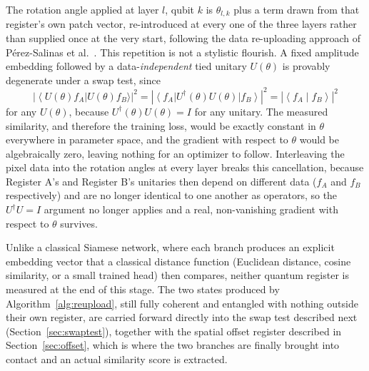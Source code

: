 \documentclass[conference]{IEEEtran}
\newcommand{\ket}[1]{\left|#1\right\rangle}
\newcommand{\bra}[1]{\left\langle#1\right|}
\newcommand{\braket}[2]{\left\langle#1\middle|#2\right\rangle}
\begin{document}
The rotation angle applied at layer $l$, qubit $k$ is $\theta_{l,k}$ plus a term drawn from that register's own patch vector, re-introduced at every one of the three layers rather than supplied once at the very start, following the data re-uploading approach of P\'erez-Salinas et al.~\cite{reuploading2020}. This repetition is not a stylistic flourish. A fixed amplitude embedding followed by a data-\emph{independent} tied unitary $U(\theta)$ is provably degenerate under a swap test, since
\begin{equation}
\left|\bra{U(\theta)f_A}U(\theta)f_B\rangle\right|^2
= \left|\bra{f_A}U^\dagger(\theta)U(\theta)\ket{f_B}\right|^2
= \left|\braket{f_A}{f_B}\right|^2
\label{eq:degenerate}
\end{equation}
for any $U(\theta)$, because $U^\dagger(\theta)U(\theta) = I$ for any unitary. The measured similarity, and therefore the training loss, would be exactly constant in $\theta$ everywhere in parameter space, and the gradient with respect to $\theta$ would be algebraically zero, leaving nothing for an optimizer to follow. Interleaving the pixel data into the rotation angles at every layer breaks this cancellation, because Register A's and Register B's unitaries then depend on different data ($f_A$ and $f_B$ respectively) and are no longer identical to one another as operators, so the $U^\dagger U = I$ argument no longer applies and a real, non-vanishing gradient with respect to $\theta$ survives.

Unlike a classical Siamese network, where each branch produces an explicit embedding vector that a classical distance function (Euclidean distance, cosine similarity, or a small trained head) then compares, neither quantum register is measured at the end of this stage. The two states produced by Algorithm~\ref{alg:reupload}, still fully coherent and entangled with nothing outside their own register, are carried forward directly into the swap test described next (Section~\ref{sec:swaptest}), together with the spatial offset register described in Section~\ref{sec:offset}, which is where the two branches are finally brought into contact and an actual similarity score is extracted.
\end{document}
